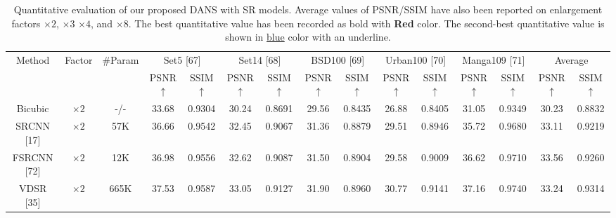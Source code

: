 \documentclass{ieeeaccess}
\begin{document}
\begin{table}
\caption{Quantitative evaluation of our proposed DANS with SR models. Average values of PSNR/SSIM have also been reported on enlargement factors $\times 2$, $\times 3$ $\times 4$, and $\times 8$. The best quantitative value has been recorded as bold with {\color{red}\textbf{Red }} color. The second-best quantitative value is shown in {\color{blue}\underline{blue}} color with an underline.}

\label{table2}
\setlength{\tabcolsep}{4.5 pt}
\begin{tabular}{|c|c|c|cc|cc|cc|cc|cc|cc|}
\hline
\multirow{2}{*}{Method} & \multirow{2}{*}{Factor} & \multirow{2}{*}{\#Param}& \multicolumn{2}{c|}{Set5 [67]}& \multicolumn{2}{c|}{Set14 [68]}& \multicolumn{2}{c|}{BSD100 [69]}& \multicolumn{2}{c|}{Urban100 [70]}& \multicolumn{2}{c|}{Manga109 [71]}& \multicolumn{2}{c|}{Average}\\


 \cline{4-15}&&& \multicolumn{1}{c|}{PSNR$\uparrow$}  & SSIM{$\uparrow$}   & \multicolumn{1}{c|}{PSNR$\uparrow$}  & SSIM {$\uparrow$}   & \multicolumn{1}{c|}{PSNR$\uparrow$}  & SSIM {$\uparrow$}   & \multicolumn{1}{c|}{PSNR$\uparrow$}  & SSIM {$\uparrow$}  & \multicolumn{1}{c|}{PSNR$\uparrow$}  & SSIM {$\uparrow$}   & \multicolumn{1}{c|}{PSNR$\uparrow$}  & SSIM {$\uparrow$}  \\
 \hline

Bicubic&$\times2$ & -/-& \multicolumn{1}{c|}{33.68 } & 0.9304  & \multicolumn{1}{c|}{30.24 } &0.8691  & \multicolumn{1}{c|}{29.56 } & 0.8435  & \multicolumn{1}{c|}{26.88 } & 0.8405  & \multicolumn{1}{c|}{31.05 } & 0.9349&
\multicolumn{1}{c|}{30.23} & 0.8832 \\


SRCNN [17] & $\times 2$ & 57K& \multicolumn{1}{c|}{36.66 } & 0.9542  & \multicolumn{1}{c|}{32.45 } & 0.9067  &\multicolumn{1}{c|}{31.36 } & 0.8879  & \multicolumn{1}{c|}{29.51 } &0.8946 & \multicolumn{1}{c|}{35.72} &0.9680
&\multicolumn{1}{c|}{33.11} & 0.9219\\

FSRCNN [72]& $\times 2$& 12K & \multicolumn{1}{c|}{36.98} &0.9556& \multicolumn{1}{c|}{32.62} & 0.9087 &\multicolumn{1}{c|}{31.50} &0.8904& \multicolumn{1}{c|}{29.58} &0.9009& \multicolumn{1}{c|}{36.62} &0.9710
&\multicolumn{1}{c|}{33.56} & 0.9260\\

VDSR [35]& $\times 2$&665K& \multicolumn{1}{c|}{37.53} & 0.9587 & \multicolumn{1}{c|}{33.05} & 0.9127 &\multicolumn{1}{c|}{31.90} & 0.8960& \multicolumn{1}{c|}{30.77} & 0.9141 & \multicolumn{1}{c|}{37.16} & 0.9740
&\multicolumn{1}{c|}{33.24} & 0.9314\\


\end{tabular}
\end{table}
\end{document}
